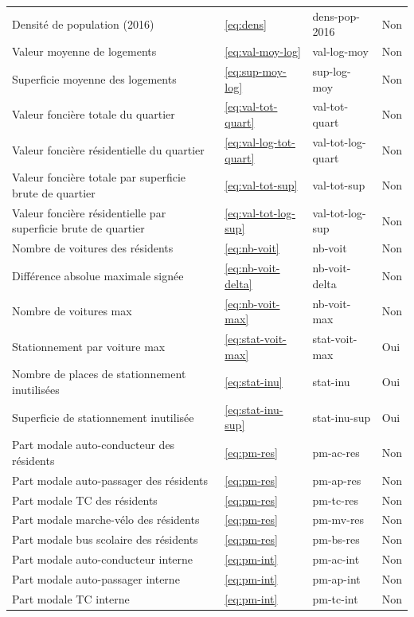 {\begin{center}
\begin{longtable}{p{8cm}m{1.5cm}ll}
         Densité de population (2016) & \ref{eq:dens} & dens-pop-2016 & Non\\
         Valeur moyenne de logements & \ref{eq:val-moy-log} & val-log-moy & Non\\
         Superficie moyenne des logements & \ref{eq:sup-moy-log} & sup-log-moy & Non\\
         Valeur foncière totale du quartier & \ref{eq:val-tot-quart}& val-tot-quart & Non\\
         Valeur foncière résidentielle du quartier & \ref{eq:val-log-tot-quart} &  val-tot-log-quart& Non\\
         Valeur foncière totale par superficie brute de quartier & \ref{eq:val-tot-sup} & val-tot-sup & Non\\
         Valeur foncière résidentielle par superficie brute de quartier & \ref{eq:val-tot-log-sup}& val-tot-log-sup & Non\\
         Nombre de voitures des résidents &\ref{eq:nb-voit} & nb-voit & Non\\
         Différence absolue maximale signée &\ref{eq:nb-voit-delta} & nb-voit-delta & Non\\
         Nombre de voitures max & \ref{eq:nb-voit-max} & nb-voit-max & Non\\
         Stationnement par voiture max & \ref{eq:stat-voit-max} & stat-voit-max & Oui \\
         Nombre de places de stationnement inutilisées & \ref{eq:stat-inu} & stat-inu & Oui\\
         Superficie de stationnement inutilisée & \ref{eq:stat-inu-sup} & stat-inu-sup & Oui\\
         Part modale auto-conducteur des résidents & \ref{eq:pm-res} & pm-ac-res& Non\\
         Part modale auto-passager des résidents & \ref{eq:pm-res} & pm-ap-res& Non\\
         Part modale \ac{TC} des résidents & \ref{eq:pm-res} & pm-tc-res & Non\\
         Part modale marche-vélo des résidents & \ref{eq:pm-res} & pm-mv-res& Non\\
         Part modale bus scolaire des résidents & \ref{eq:pm-res} & pm-bs-res& Non\\
         Part modale auto-conducteur interne & \ref{eq:pm-int} & pm-ac-int  & Non\\
         Part modale auto-passager interne & \ref{eq:pm-int} & pm-ap-int& Non \\
         Part modale \ac{TC} interne& \ref{eq:pm-int} & pm-tc-int& Non\\

\end{longtable}
\end{center}}
